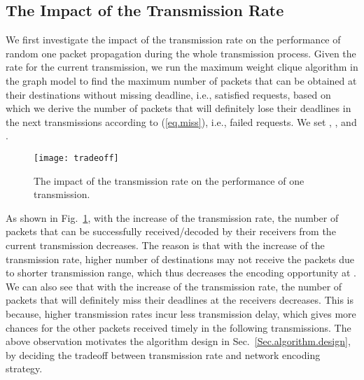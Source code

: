 \documentclass[journal]{IEEEtran}
\begin{document}
\subsection{The Impact of the Transmission Rate}\vspace{-0.02in}
We first investigate the impact of the transmission rate on the performance of random one packet propagation during the whole transmission process. Given the rate for the current transmission, we run the maximum weight clique algorithm in the graph model to find the maximum number of packets that can be obtained at their destinations without missing deadline, i.e., satisfied requests, based on which we derive the number of packets that will definitely lose their deadlines in the next transmissions according to (\ref{eq.miss}), i.e., failed requests. We set , , and .
\begin{figure}[h]
\begin{center}\vspace{-0.1in}
\texttt{[image: tradeoff]}\vspace{-0.1in}
\caption{The impact of the transmission rate on the performance of one transmission.}\vspace{-0.15in} \label{sim.tradeoff}
\end{center}\vspace{-0.1in}
\end{figure}

As shown in Fig.~\ref{sim.tradeoff}, with the increase of the transmission rate, the number of packets that can be successfully received/decoded by their receivers from the current transmission decreases. The reason is that with the increase of the transmission rate, higher number of destinations may not receive the packets due to shorter transmission range, which thus decreases the encoding opportunity at . We can also see that with the increase of the transmission rate, the number of packets that will definitely miss their deadlines at the receivers decreases. This is because, higher transmission rates incur less transmission delay, which gives more chances for the other packets received timely in the following transmissions. The above observation motivates the algorithm design in Sec.~\ref{Sec.algorithm.design}, by deciding the tradeoff between transmission rate and network encoding strategy.
\end{document}
